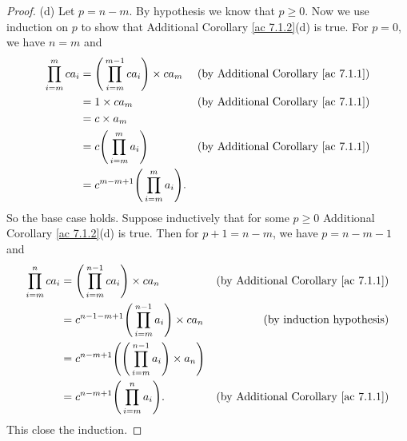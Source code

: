 \begin{proof}{(d)}
    Let \(p = n - m\).
    By hypothesis we know that \(p \geq 0\).
    Now we use induction on \(p\) to show that Additional Corollary \ref{ac 7.1.2}(d) is true.
    For \(p = 0\), we have \(n = m\) and
    \begin{align*}
        \prod_{i = m}^m ca_i & = \Bigg(\prod_{i = m}^{m - 1} ca_i\Bigg) \times ca_m & \text{(by Additional Corollary \ref{ac 7.1.1})} \\
                             & = 1 \times ca_m                                      & \text{(by Additional Corollary \ref{ac 7.1.1})} \\
                             & = c \times a_m                                                                                         \\
                             & = c \Bigg(\prod_{i = m}^m a_i\Bigg)                  & \text{(by Additional Corollary \ref{ac 7.1.1})} \\
                             & = c^{m - m + 1} \Bigg(\prod_{i = m}^m a_i\Bigg).
    \end{align*}
    So the base case holds.
    Suppose inductively that for some \(p \geq 0\) Additional Corollary \ref{ac 7.1.2}(d) is true.
    Then for \(p + 1 = n - m\), we have \(p = n - m - 1\) and
    \begin{align*}
        \prod_{i = m}^n ca_i & = \Bigg(\prod_{i = m}^{n - 1} ca_i\Bigg) \times ca_n                         & \text{(by Additional Corollary \ref{ac 7.1.1})} \\
                             & = c^{n - 1 - m + 1} \Bigg(\prod_{i = m}^{n - 1} a_i\Bigg) \times ca_n        & \text{(by induction hypothesis)}                \\
                             & = c^{n - m + 1} \Bigg(\Bigg(\prod_{i = m}^{n - 1} a_i\Bigg) \times a_n\Bigg)                                                   \\
                             & = c^{n - m + 1} \Bigg(\prod_{i = m}^n a_i\Bigg).                             & \text{(by Additional Corollary \ref{ac 7.1.1})}
    \end{align*}
    This close the induction.
\end{proof}

